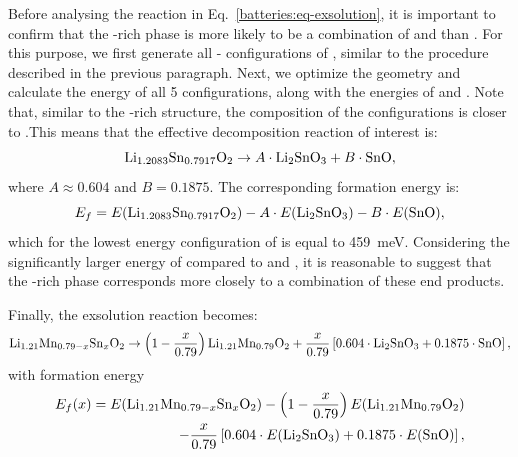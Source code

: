 \begin{refsection}
Before analysing the reaction in Eq.~\ref{batteries:eq-exsolution}, it is 
important to confirm that the -rich phase is more likely to be a 
combination of  and  than . For 
this purpose, we first generate all - configurations of 
, similar to the procedure described in the previous 
paragraph. Next, we optimize the geometry and calculate the energy of all 5 
configurations, along with the energies of  and . Note 
that, similar to the -rich  structure, the composition of the 
configurations is closer to .This means that the 
effective decomposition reaction of interest is: 
\begin{equation} \label{batteries:eq-Sn-decomposition} 
\ce{Li_{1.2083}Sn_{0.7917}O2} \rightarrow  A  \cdot \ce{Li2SnO3} + B \cdot 
\ce{SnO}, 
\end{equation} 
where $A \approx 0.604$ and $B = 0.1875$. The corresponding formation energy 
is: 
\begin{equation} 
E_f = E(\ce{Li_{1.2083}Sn_{0.7917}O2}) - A \cdot E(\ce{Li2SnO3}) - B \cdot 
E(\ce{SnO}), 
\end{equation} 
which for the lowest energy configuration of  is 
equal to 459~\si{\milli\electronvolt}. Considering the significantly larger 
energy of  compared to  and , 
it is reasonable to suggest that the -rich phase corresponds more 
closely to a combination of these end products. 
 
Finally, the exsolution reaction becomes: 
\begin{equation} \label{batteries:eq-exsolution_final} 
 \ce{Li_{1.21}Mn_{0.79-x}Sn_xO2} \rightarrow  \left( 1 - \frac{x}{0.79} 
\right) \ce{Li_{1.21}Mn_{0.79}O2} +  \frac{x}{0.79} \left[  0.604 \cdot 
\ce{Li2SnO3} + 0.1875 \cdot \ce{SnO} \right], 
\end{equation} 
with formation energy 
\begin{align} \label{batteries:eq-exsolution_final_formation} 
 E_f(x) = E(\ce{Li_{1.21}Mn_{0.79-x}Sn_xO2}) -  \left( 1 - \frac{x}{0.79} 
\right) E(\ce{Li_{1.21}Mn_{0.79}O2}) \nonumber \\ -  \frac{x}{0.79} \left[  0.604 \cdot 
E(\ce{Li2SnO3}) + 0.1875 \cdot E(\ce{SnO}) \right], 
\end{align} 
 
 

\end{refsection}
